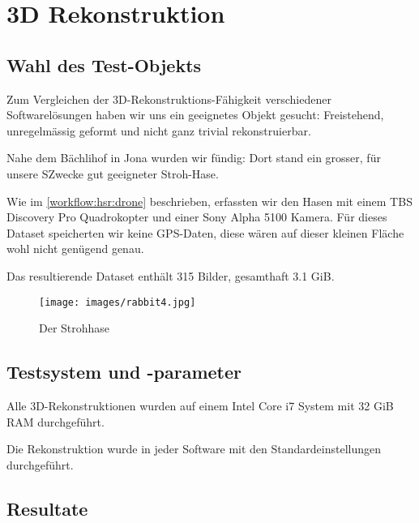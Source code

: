 \chapter{3D Rekonstruktion}

\label{ch:eval-3d}


\section{Wahl des Test-Objekts}

Zum Vergleichen der 3D-Rekonstruktions-Fähigkeit verschiedener Softwarelösungen
haben wir uns ein geeignetes Objekt gesucht: Freistehend, unregelmässig geformt
und nicht ganz trivial rekonstruierbar.

Nahe dem Bächlihof in Jona wurden wir fündig: Dort stand ein grosser, für unsere
SZwecke gut geeigneter Stroh-Hase.

Wie im \autoref{workflow:hsr:drone} beschrieben, erfassten wir den Hasen mit
einem TBS Discovery Pro Quadrokopter und einer Sony Alpha 5100 Kamera. Für
dieses Dataset speicherten wir keine GPS-Daten, diese wären auf dieser kleinen
Fläche wohl nicht genügend genau.

Das resultierende Dataset enthält 315 Bilder, gesamthaft 3.1 GiB.

\begin{figure}[H]
	\centering
	\texttt{[image: images/rabbit4.jpg]}
	\caption{Der Strohhase}
	\label{img:rabbit4}
\end{figure}


\section{Testsystem und -parameter}

Alle 3D-Rekonstruktionen wurden auf einem Intel Core i7 System mit 32 GiB RAM
durchgeführt.   %

Die Rekonstruktion wurde in jeder Software mit den Standardeinstellungen
durchgeführt.


\section{Resultate}

